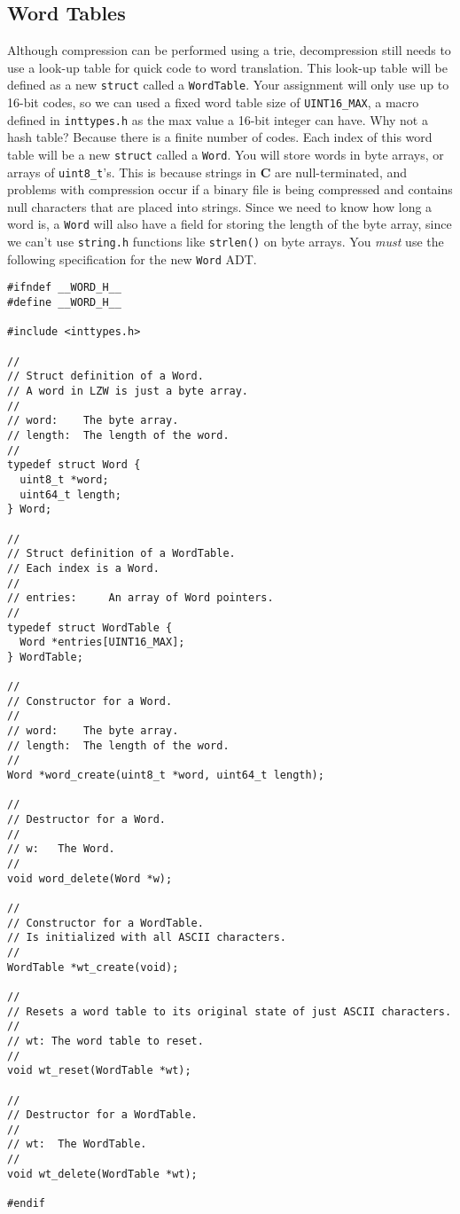 \documentclass{article}
\begin{document}
\subsection{Word Tables}

Although compression can be performed using a trie, decompression still needs to
use a look-up table for quick code to word translation. This look-up table will
be defined as a new \texttt{struct} called a \texttt{WordTable}. Your assignment
will only use up to 16-bit codes, so we can used a fixed word table size of
\texttt{UINT16\_MAX}, a macro defined in \texttt{inttypes.h} as the max value a
16-bit integer can have. Why not a hash table? Because there is a finite number
of codes. Each index of this word table will be a new \texttt{struct} called a
\texttt{Word}. You will store words in byte arrays, or arrays of
\texttt{uint8\_t}'s. This is because strings in \textbf{C} are null-terminated,
and problems with compression occur if a binary file is being compressed and
contains null characters that are placed into strings. Since we need to know how
long a word is, a \texttt{Word} will also have a field for storing the length of
the byte array, since we can't use \texttt{string.h} functions like
\texttt{strlen()} on byte arrays. You \emph {must} use the following
specification for the new \texttt{Word} ADT.

\begin{lstlisting}
#ifndef __WORD_H__
#define __WORD_H__

#include <inttypes.h>

//
// Struct definition of a Word.
// A word in LZW is just a byte array.
//
// word:    The byte array.
// length:  The length of the word.
//
typedef struct Word {
  uint8_t *word;
  uint64_t length;
} Word;

//
// Struct definition of a WordTable.
// Each index is a Word.
//
// entries:     An array of Word pointers.
//
typedef struct WordTable {
  Word *entries[UINT16_MAX];
} WordTable;

//
// Constructor for a Word.
//
// word:    The byte array.
// length:  The length of the word.
//
Word *word_create(uint8_t *word, uint64_t length);

//
// Destructor for a Word.
//
// w:   The Word.
//
void word_delete(Word *w);

//
// Constructor for a WordTable.
// Is initialized with all ASCII characters.
//
WordTable *wt_create(void);

//
// Resets a word table to its original state of just ASCII characters.
//
// wt: The word table to reset.
//
void wt_reset(WordTable *wt);

//
// Destructor for a WordTable.
//
// wt:  The WordTable.
//
void wt_delete(WordTable *wt);

#endif
\end{lstlisting}
\end{document}
